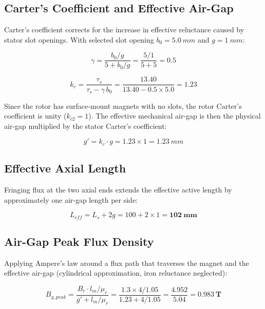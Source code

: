 \documentclass[12pt, a4paper]{article}
\begin{document}
\subsection{Carter's Coefficient and Effective Air-Gap}

Carter's coefficient corrects for the increase in effective reluctance
caused by stator slot openings. With selected slot opening $b_0 = \SI{5.0}{mm}$
and $g = \SI{1}{mm}$:

\begin{equation}
    \gamma = \frac{b_0/g}{5 + b_0/g}
           = \frac{5/1}{5 + 5}
           = 0.5
\end{equation}

\begin{equation}
    k_c = \frac{\tau_s}{\tau_s - \gamma\, b_0}
        = \frac{13.40}{13.40 - 0.5 \times 5.0}
        = \mathbf{1.23}
\end{equation}

Since the rotor has surface-mount magnets with no slots, the rotor
Carter's coefficient is unity ($k_{c2} = 1$). The effective mechanical
air-gap is then the physical air-gap multiplied by the stator Carter's coefficient:

\begin{equation}
    g' = k_c \cdot g = 1.23 \times 1 = \SI{1.23}{mm}
\end{equation}

\subsection{Effective Axial Length}

Fringing flux at the two axial ends extends the effective active length
by approximately one air-gap length per side:

\begin{equation}
    L_{eff} = L_s + 2g = 100 + 2\times 1 = \mathbf{\SI{102}{mm}}
\end{equation}

\subsection{Air-Gap Peak Flux Density}

Applying Ampere's law around a flux path that traverses the magnet and
the effective air-gap (cylindrical approximation, iron reluctance
neglected):

\begin{equation}
    B_{g,peak}
        = \frac{B_r \cdot l_m/\mu_r}{g' + l_m/\mu_r}
        = \frac{1.3 \times 4/1.05}{1.23 + 4/1.05}
        = \frac{4.952}{5.04}
        = \mathbf{\SI{0.983}{T}}
\end{equation}
\end{document}
